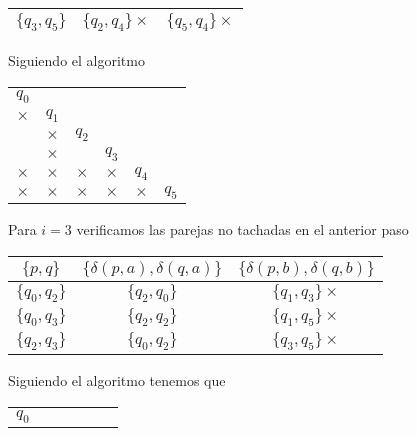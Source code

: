 \begin{itemize}
\begin{center}
\begin{tabular}{c||c|c}
                  $\{q_3,q_5\}$ & $\{q_2,q_4\}\times$ & $\{q_5,q_4\}\times$ \\ \hline
                \end{tabular}
            \end{center}
            Siguiendo el algoritmo
            \begin{center}
            \begin{tabular}{cccccc}
                $q_0$ \\ \cline{1-1}
                \multicolumn{1}{|c|}{$\times$} & $q_1$ \\ \cline{1-2}
                \multicolumn{1}{|c|}{} & \multicolumn{1}{|c|}{$\times$} & $q_2$ \\ \cline{1-3}
                \multicolumn{1}{|c|}{} & \multicolumn{1}{|c|}{$\times$} & \multicolumn{1}{|c|}{} & $q_3$ \\ \cline{1-4}
                \multicolumn{1}{|c|}{$\times$} & \multicolumn{1}{|c|}{$\times$} & \multicolumn{1}{|c|}{$\times$}& \multicolumn{1}{|c|}{$\times$}& $q_4$ \\ \cline{1-5}
                \multicolumn{1}{|c|}{$\times$} & \multicolumn{1}{|c|}{$\times$} & \multicolumn{1}{|c|}{$\times$} & \multicolumn{1}{|c|}{$\times$}& \multicolumn{1}{|c|}{$\times$} & $q_5$ \\ \cline{1-5}
            \end{tabular}
        \end{center}
        Para $i=3$ verificamos las parejas no tachadas en el anterior paso
        \begin{center}
                \begin{tabular}{c||c|c}
                  $\{p,q\}$ & $\{\delta(p,a),\delta(q,a)\}$ & $\{\delta(p,b),\delta(q,b)\}$\\ \hline
                  $\{q_0,q_2\}$ & $\{q_2,q_0\}$ & $\{q_1,q_3\}\times$ \\ \hline
                  $\{q_0,q_3\}$ & $\{q_2,q_2\}$ & $\{q_1,q_5\}\times$ \\ \hline
                  $\{q_2,q_3\}$ & $\{q_0,q_2\}$ & $\{q_3,q_5\}\times$ \\ \hline
                \end{tabular}
            \end{center}
            Siguiendo el algoritmo tenemos que
            \begin{center}
            \begin{tabular}{cccccc}
                $q_0$ \\ \cline{1-1}

\end{tabular}
\end{center}
\end{itemize}
